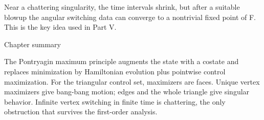 Near a chattering singularity, the time intervals shrink, but after a suitable blowup the angular switching data can converge to a nontrivial fixed point of F. This is the key idea used in Part V.


\begin{insightbox}{Chapter summary}
\end{insightbox}

The Pontryagin maximum principle augments the state with a costate and replaces minimization by Hamiltonian evolution plus pointwise control maximization. For the triangular control set, maximizers are faces. Unique vertex maximizers give bang-bang motion; edges and the whole triangle give singular behavior. Infinite vertex switching in finite time is chattering, the only obstruction that survives the first-order analysis.

